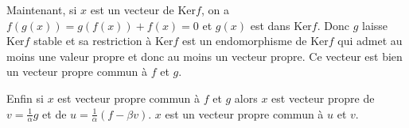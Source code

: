 {{ 
Maintenant, si $x$ est un vecteur de $\text{Ker}f$, on a $f(g(x))= g(f(x))+f(x) = 0$ et $g(x)$ est dans $\text{Ker}f$. Donc $g$ laisse $\text{Ker}f$ stable et sa restriction à $\text{Ker}f$ est un endomorphisme de $\text{Ker}f$ qui admet au moins une valeur propre et donc au moins un vecteur propre. Ce vecteur est bien un vecteur propre commun à $f$ et $g$. 

Enfin si $x$ est vecteur propre commun à $f$ et $g$ alors $x$ est vecteur propre de $v =\frac{1}{\alpha}g$ et de $u=\frac{1}{\alpha}(f-\beta v)$. $x$ est un vecteur propre commun à $u$ et $v$.
}
}
